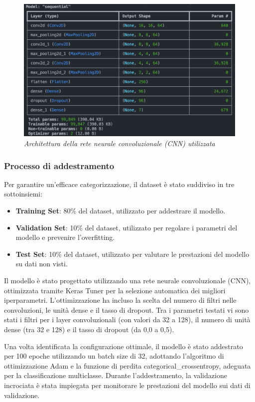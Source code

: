 \begin{figure}[ht]
    \centering
        \centering
        \includegraphics[width=0.8\linewidth]{images/cnn_architecture.png}
        \caption{\emph{Architettura della rete neurale convoluzionale (CNN) utilizzata}}
        \label{fig:cnn_architecture}
\end{figure}

\subsubsection{Processo di addestramento}
Per garantire un'efficace categorizzazione, il dataset è stato suddiviso in tre sottoinsiemi: 
\begin{itemize}
    \item \textbf{Training Set}: 80\% del dataset, utilizzato per addestrare il modello.
    \item \textbf{Validation Set}: 10\% del dataset, utilizzato per regolare i parametri del modello e prevenire l'overfitting.
    \item \textbf{Test Set}: 10\% del dataset, utilizzato per valutare le prestazioni del modello su dati non visti.
\end{itemize}
Il modello è stato progettato utilizzando una rete neurale convoluzionale (CNN), ottimizzata tramite Keras Tuner per la selezione automatica dei migliori iperparametri. L'ottimizzazione ha incluso la scelta del numero di filtri nelle convoluzioni, le unità dense e il tasso di dropout. Tra i parametri testati vi sono stati i filtri per i layer convoluzionali (con valori da 32 a 128), il numero di unità dense (tra 32 e 128) e il tasso di dropout (da 0,0 a 0,5).

Una volta identificata la configurazione ottimale, il modello è stato addestrato per 100 epoche utilizzando un batch size di 32, adottando l'algoritmo di ottimizzazione Adam e la funzione di perdita categorical\_crossentropy, adeguata per la classificazione multi\-classe. Durante l'addestramento, la validazione incrociata è stata impiegata per monitorare le prestazioni del modello sui dati di validazione.

